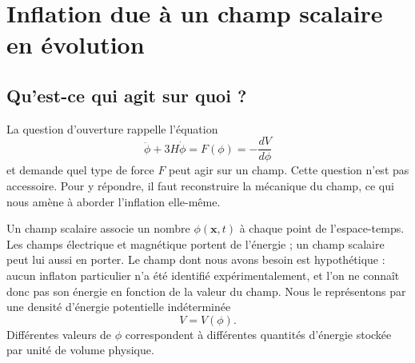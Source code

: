 \chapter{Inflation due à un champ scalaire en évolution}


\section{Qu’est-ce qui agit sur quoi ?}

La question d’ouverture rappelle l’équation
\begin{equation}
\ddot\phi+3H\dot\phi
=F(\phi)
=-\frac{dV}{d\phi}
\label{eq:c09-opening}
\end{equation}
et demande quel type de force \(F\) peut agir sur un champ. Cette question n’est pas accessoire. Pour y répondre, il faut reconstruire la mécanique du champ, ce qui nous amène à aborder l’inflation elle-même.

Un champ scalaire associe un nombre \(\phi(\mathbf x,t)\) à chaque point de l’espace-temps. Les champs électrique et magnétique portent de l’énergie ; un champ scalaire peut lui aussi en porter. Le champ dont nous avons besoin est hypothétique : aucun inflaton particulier n’a été identifié expérimentalement, et l’on ne connaît donc pas son énergie en fonction de la valeur du champ. Nous le représentons par une densité d’énergie potentielle indéterminée
\begin{equation}
V=V(\phi).
\label{eq:c09-potential}
\end{equation}
Différentes valeurs de \(\phi\) correspondent à différentes quantités d’énergie stockée par unité de volume physique.

